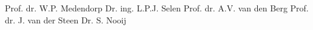 \thispagestyle{empty}



\clearpage
\thispagestyle{empty}
	
\noindent {}
\noindent \npar Prof. dr. W.P. Medendorp
\npar
\noindent {}
\noindent \npar Dr. ing. L.P.J. Selen
\npar
\vspace{0.5cm}
\noindent {}
\noindent \npar Prof. dr. A.V. van den Berg
\noindent \npar Prof. dr. J. van der Steen
\noindent \npar Dr. S. Nooij

